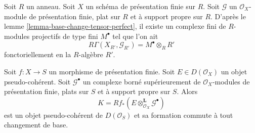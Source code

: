 \begin{remark}
\label{remark-explain-perfect-direct-image}
Soit $R$ un anneau. Soit $X$ un schéma de présentation finie sur
$R$. Soit $\mathcal{G}$ un $\mathcal{O}_X$-module de présentation finie,
plat sur $R$ et à support propre sur $R$. D'après le
lemme \ref{lemma-base-change-tensor-perfect},
il existe un complexe fini de $R$-modules projectifs de type fini
$M^\bullet$ tel que l'on ait
$$
R\Gamma(X_{R'}, \mathcal{G}_{R'}) = M^\bullet \otimes_R R'
$$
fonctoriellement en la $R$-algèbre $R'$.
\end{remark}

\begin{lemma}
\label{lemma-base-change-tensor-pseudo-coherent}
Soit $f : X \to S$ un morphisme de présentation finie.
Soit $E \in D(\mathcal{O}_X)$ un objet pseudo-cohérent.
Soit $\mathcal{G}^\bullet$ un complexe borné supérieurement de
$\mathcal{O}_X$-modules de présentation finie, plats sur $S$
et à support propre sur $S$. Alors
$$
K = Rf_*(E \otimes_{\mathcal{O}_X}^\mathbf{L} \mathcal{G}^\bullet)
$$
est un objet pseudo-cohérent de $D(\mathcal{O}_S)$ et sa formation
commute à tout changement de base.
\end{lemma}

